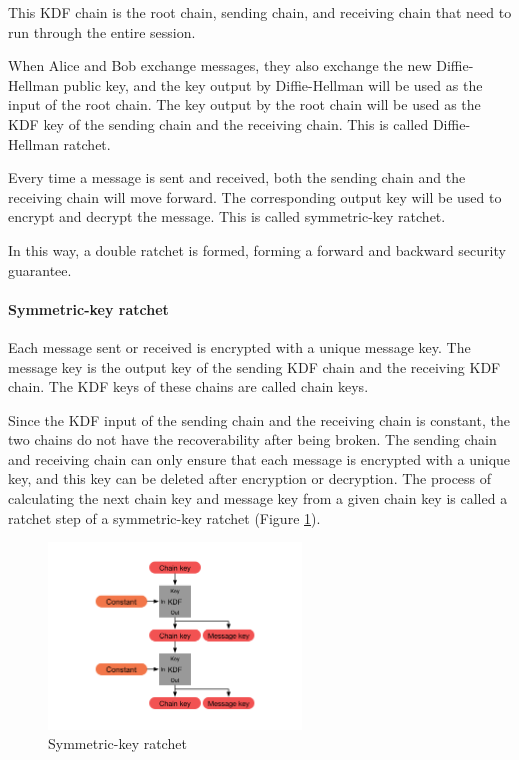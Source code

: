 \documentclass[11pt,en]{elegantpaper}
\begin{document}
This KDF chain is the root chain, sending chain, and receiving chain that need to run through the entire session.

When Alice and Bob exchange messages, they also exchange the new Diffie-Hellman public key, and the key output by Diffie-Hellman will be used as the input of the root chain. The key output by the root chain will be used as the KDF key of the sending chain and the receiving chain. This is called Diffie-Hellman ratchet.

Every time a message is sent and received, both the sending chain and the receiving chain will move forward. The corresponding output key will be used to encrypt and decrypt the message. This is called symmetric-key ratchet.

In this way, a double ratchet is formed, forming a forward and backward security guarantee.

\paragraph{Symmetric-key ratchet}

Each message sent or received is encrypted with a unique message key. The message key is the output key of the sending KDF chain and the receiving KDF chain. The KDF keys of these chains are called chain keys\cite{poettering2018towards}.

Since the KDF input of the sending chain and the receiving chain is constant, the two chains do not have the recoverability after being broken. The sending chain and receiving chain can only ensure that each message is encrypted with a unique key, and this key can be deleted after encryption or decryption. The process of calculating the next chain key and message key from a given chain key is called a ratchet step of a symmetric-key ratchet (Figure \ref{skratchet}).

\begin{figure}[H]
    \centering
    \includegraphics[width=0.6\textwidth]{image/skratchet}
    \caption{Symmetric-key ratchet}
    \label{skratchet}
\end{figure}
\end{document}

